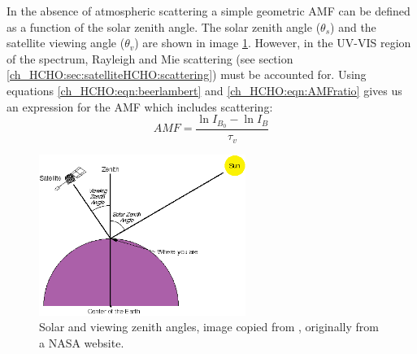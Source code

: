    In the absence of atmospheric scattering a simple geometric AMF can be defined as a function of the solar zenith angle. 
    The solar zenith angle ($\theta_s$) and the satellite viewing angle ($\theta_v$) are shown in image \ref{ch_HCHO:fig:zenithangle}.
    However, in the UV-VIS region of the spectrum, Rayleigh and Mie scattering (see section \ref{ch_HCHO:sec:satelliteHCHO:scattering}) must be accounted for.
    Using equations \ref{ch_HCHO:eqn:beerlambert} and \ref{ch_HCHO:eqn:AMFratio} gives us an expression for the AMF which includes scattering:
    \begin{equation} \label{Model:omiRecalc:eqn_amfscattering}
    AMF = \frac{\ln{I_{B_0}}-\ln{I_B}}{\tau_v}
    \end{equation}
    
    \begin{figure}[!htbp]\begin{center}
      \includegraphics[width=0.6\textwidth]{Figures/ZenithAngles.png}
      \caption{Solar and viewing zenith angles, image copied from \citet{SZA_Image}, originally from a NASA website.}
      \label{ch_HCHO:fig:zenithangle}
    \end{center}\end{figure}
    
